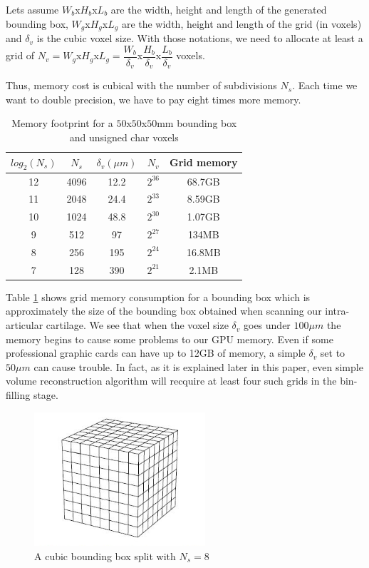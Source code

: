 \documentclass[12pt,journal,compsoc]{IEEEtran}
\begin{document}
Lets assume $W_b$x$H_b$x$L_b$ are the width, height and length of the generated bounding box, $W_g$x$H_g$x$L_g$ are the width, height and length of the grid (in voxels) and $\delta_v$ is the cubic voxel size. With those notations, we need to allocate at least a grid of $N_v = W_g$x$H_g$x$L_g =  \dfrac{W_b}{\delta_v}$x$\dfrac{H_b}{\delta_v}$x$\dfrac{L_b}{\delta_v}$ voxels. \par

\vspace{0.2cm}
Thus, memory cost is cubical with the number of subdivisions $N_s$. Each time we want to double precision, we have to pay eight times more memory.

\begin{table}[!t]
\renewcommand{\arraystretch}{1.3}
\caption{Memory footprint for a $50$x$50$x$50$mm bounding box and unsigned char voxels}
\label{memory_table}
\centering
\begin{tabular}{|c|c||c|c||c|}
\hline
$log_2(N_s)$ & $N_s$ & $\delta_v (\mu m)$ & $N_v$ & Grid memory \\
\hline
12 & 4096 & 12.2 & $2^{36}$ & 68.7GB\\\hline
11 & 2048 & 24.4 & $2^{33}$ & 8.59GB\\\hline
10 & 1024 & 48.8 & $2^{30}$ & 1.07GB\\\hline
9 & 512 & 97 & $2^{27}$ & 134MB\\\hline
8 & 256 & 195 & $2^{24}$ & 16.8MB\\\hline
7 & 128 & 390 & $2^{21}$ & 2.1MB\\\hline
\end{tabular}
\end{table}
Table \ref{memory_table} shows grid memory consumption for a bounding box which is approximately the size of the bounding box obtained when scanning our intra-articular cartilage.
We see that when the voxel size $\delta_v$ goes under $100\mu m$ the memory begins to cause some problems to our GPU memory.
Even if some professional graphic cards can have up to 12GB of memory, a simple $\delta_v$ set to $50\mu m$ can cause trouble.
In fact, as it is explained later in this paper, even simple volume reconstruction algorithm will recquire at least four such grids in the bin-filling stage.

\begin{figure}[!h]
\centering
\includegraphics[width=2.5in]{grid}
\caption{A cubic bounding box split with $N_s=8$}
\label{grid}
\end{figure}
\end{document}
